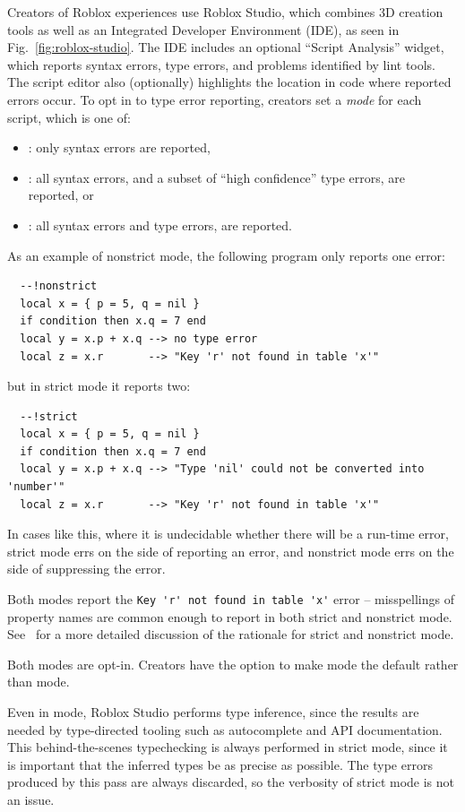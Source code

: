 \documentclass[english,submission,cleveref]{programming}
\begin{document}
Creators of {Roblox experiences} use {Roblox Studio},
which combines {3D creation} tools as well as an Integrated
Developer Environment (IDE), as seen in Fig.~\ref{fig:roblox-studio}.
The IDE includes an optional ``Script Analysis'' widget, which
reports syntax errors, type errors, and problems identified by
lint tools. The script editor also (optionally) highlights
the location in code where reported errors occur.
To opt in to type error reporting, creators set a \emph{mode}
for each script, which is one of:
\begin{itemize}
  \item \mnocheck{}: only syntax errors are reported,
  \item \mnonstrict{}: all syntax errors, and a subset of ``high confidence'' type errors, are reported, or
  \item \mstrict{}: all syntax errors and type errors, are reported.
\end{itemize}
As an example of nonstrict mode, the following program only reports one error:
\begin{verbatim}
  --!nonstrict
  local x = { p = 5, q = nil }
  if condition then x.q = 7 end
  local y = x.p + x.q --> no type error
  local z = x.r       --> "Key 'r' not found in table 'x'"
\end{verbatim}
but in strict mode it reports two:
\begin{verbatim}
  --!strict
  local x = { p = 5, q = nil }
  if condition then x.q = 7 end
  local y = x.p + x.q --> "Type 'nil' could not be converted into 'number'"
  local z = x.r       --> "Key 'r' not found in table 'x'"
\end{verbatim}
In cases like this, where it is undecidable whether there will be a run-time error,
strict mode errs on the side of reporting an error, and nonstrict mode errs on
the side of suppressing the error.

Both modes report the \verb|Key 'r' not found in table 'x'| error --
misspellings of property names are common enough to report in both
strict and nonstrict mode. See~\cite{bfj-hatra-2021}
for a more detailed discussion of the rationale for strict and nonstrict mode.

Both modes are opt-in. Creators have the option to make \mnonstrict{} mode
the default rather than \mnocheck{} mode.

Even in \mnocheck{} mode, {Roblox Studio} performs type inference, since
the results are needed by type-directed tooling such as autocomplete and
API documentation. This behind-the-scenes typechecking is always performed
in strict mode, since it is important that the inferred types be as precise
as possible. The type errors produced by this pass are always discarded,
so the verbosity of strict mode is not an issue.
\end{document}
